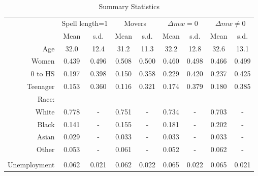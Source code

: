 \documentclass{article}
\begin{document}
\begin{table}[!htbp]
	\centering
	\caption{Summary Statistics}
	\begin{tabular}{rcccccccc}
		
		& \multicolumn{ 2}{c}{Spell length=1} & \multicolumn{ 2}{c}{Movers} & \multicolumn{ 2}{c}{$\Delta mw=0$} & \multicolumn{ 2}{c}{$\Delta mw\neq0$} \\
		
		&       Mean &       s.d. &       Mean &       s.d. &       Mean &       s.d. &       Mean &       s.d. \\
		\hline
		\hline
		Age &       32.0 &       12.4 &       31.2 &       11.3 &       32.2 &       12.8 &       32.6 &       13.1 \\
		
		Women &      0.439 &      0.496 &      0.508 &      0.500 &      0.460 &      0.498 &      0.466 &      0.499 \\
		
		0 to HS &      0.197 &      0.398 &      0.150 &      0.358 &      0.229 &      0.420 &      0.237 &      0.425 \\
		
		Teenager &      0.153 &      0.360 &      0.116 &      0.321 &      0.174 &      0.379 &      0.180 &      0.385 \\
		
		Race: &            &            &            &            &            &            &            &            \\
		
		White &      0.778 &          - &      0.751 &          - &      0.734 &          - &      0.703 &          - \\
		
		Black &      0.141 &          - &      0.155 &          - &      0.181 &          - &      0.202 &          - \\
		
		Asian &      0.029 &          - &      0.033 &          - &      0.033 &          - &      0.033 &          - \\
		
		Other &      0.053 &          - &      0.061 &          - &      0.052 &          - &      0.062 &          - \\
		
		&            &            &            &            &            &            &            &            \\
		
		Unemployment &      0.062 &      0.021 &      0.062 &      0.022 &      0.065 &      0.022 &      0.065 &      0.021 \\
		

\end{tabular}
\end{table}
\end{document}
